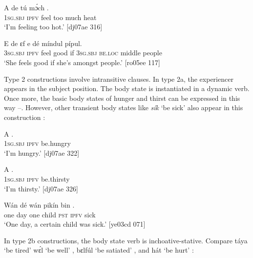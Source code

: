\ea%
    \label{ex:key:1258}
    \gll A    de    tú  mɔ́ch  .\\
\textsc{1sg.sbj}  \textsc{ipfv}  feel  too  much  heat\\

\glt ‘I’m feeling too hot.’ [dj07ae 316]
\z


\ea%
    \label{ex:key:1259}
    \gll E    de        ɛf  e    dé    míndul  pípul.\\
\textsc{3sg.sbj}  \textsc{ipfv}  feel  good  if  \textsc{3sg.sbj}  \textsc{be.loc}  middle  people\\

\glt ‘She feels good if she’s amongst people.’ [ro05ee 117]
\z

Type 2 constructions involve intransitive clauses. In type 2a, the experiencer appears in the subject position. The body state is instantiated in a dynamic verb. Once more, the basic body states of hunger and thirst can be expressed in this way –. However, other transient body states like \textit{sík} ‘be sick’ also appear in this construction : 


\ea%
    \label{ex:key:1260}
    \gll A      .\\
\textsc{1sg.sbj}  \textsc{ipfv}  be.hungry\\

\glt ‘I’m hungry.’ [dj07ae 322]
\z


\ea%
    \label{ex:key:1261}
    \gll A      .\\
\textsc{1sg.sbj}  \textsc{ipfv}  be.thirsty\\

\glt ‘I’m thirsty.’ [dj07ae 326]
\z


\ea%
    \label{ex:key:1262}
    \gll Wán    dé  wán    pikín  bin    .\\
one    day  one    child  \textsc{pst}  \textsc{ipfv}  sick\\

\glt ‘One day, a certain child was sick.’ [ye03cd 071]
\z

In type 2b constructions, the body state verb is inchoative-stative. Compare táya ‘be tired’  wɛ́l ‘be well’ , bɛlfúl ‘be satiated’ , and hát ‘be hurt’ :


